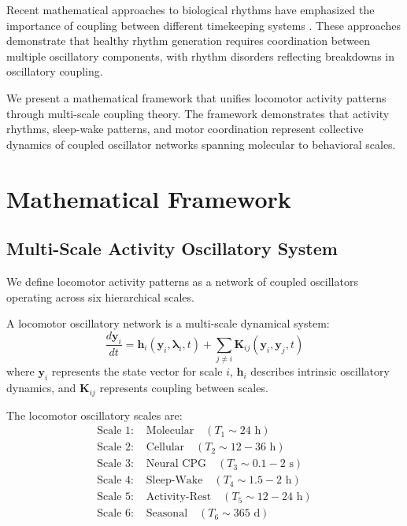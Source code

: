 \documentclass[twocolumn]{article}
\begin{document}
Recent mathematical approaches to biological rhythms have emphasized the importance of coupling between different timekeeping systems \citep{goldbeter2018origin,pittendreigh1993temporal}. These approaches demonstrate that healthy rhythm generation requires coordination between multiple oscillatory components, with rhythm disorders reflecting breakdowns in oscillatory coupling.

We present a mathematical framework that unifies locomotor activity patterns through multi-scale coupling theory. The framework demonstrates that activity rhythms, sleep-wake patterns, and motor coordination represent collective dynamics of coupled oscillator networks spanning molecular to behavioral scales.

\section{Mathematical Framework}

\subsection{Multi-Scale Activity Oscillatory System}

We define locomotor activity patterns as a network of coupled oscillators operating across six hierarchical scales.

\begin{definition}
A locomotor oscillatory network is a multi-scale dynamical system:
\begin{equation}
\frac{d\mathbf{y}_i}{dt} = \mathbf{h}_i(\mathbf{y}_i, \boldsymbol{\lambda}_i, t) + \sum_{j \neq i} \mathbf{K}_{ij}(\mathbf{y}_i, \mathbf{y}_j, t)
\label{eq:locomotor_network}
\end{equation}
where $\mathbf{y}_i$ represents the state vector for scale $i$, $\mathbf{h}_i$ describes intrinsic oscillatory dynamics, and $\mathbf{K}_{ij}$ represents coupling between scales.
\end{definition}

\begin{definition}
The locomotor oscillatory scales are:
\begin{align}
\text{Scale 1: } &\text{Molecular} \quad (T_1 \sim 24 \text{ h}) \label{eq:molecular_clock} \\
\text{Scale 2: } &\text{Cellular} \quad (T_2 \sim 12-36 \text{ h}) \label{eq:cellular_clock} \\
\text{Scale 3: } &\text{Neural CPG} \quad (T_3 \sim 0.1-2 \text{ s}) \label{eq:cpg} \\
\text{Scale 4: } &\text{Sleep-Wake} \quad (T_4 \sim 1.5-2 \text{ h}) \label{eq:sleep_wake} \\
\text{Scale 5: } &\text{Activity-Rest} \quad (T_5 \sim 12-24 \text{ h}) \label{eq:activity_rest} \\
\text{Scale 6: } &\text{Seasonal} \quad (T_6 \sim 365 \text{ d}) \label{eq:seasonal}
\end{align}
\end{definition}
\end{document}
